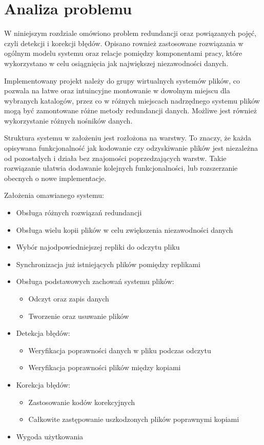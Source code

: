 \chapter{Analiza problemu}
\thispagestyle{chapterBeginStyle}
\label{rozdzial1}
W niniejszym rozdziale omówiono problem redundancji oraz powiązanych pojęć, czyli detekcji i korekcji błędów. Opisano rownież zastosowane rozwiązania w ogólnym modelu systemu oraz relacje pomiędzy komponentami pracy, które wykorzystano w celu osiągnięcia jak największej niezawodności danych.

Implementowany projekt należy do grupy wirtualnych systemów plików, co pozwala na łatwe oraz intuincyjne montowanie w dowolnym miejscu dla wybranych katalogów, przez co w różnych miejscach nadrzędnego systemu plików mogą być zamontowane różne metody redundancji danych. Możliwe jest również wykorzystanie różnych nośników danych. 

Struktura systemu w założeniu jest rozłożona na warstwy. To znaczy, że każda opisywana funkcjonalność jak kodowanie czy odzyskiwanie plików jest niezależna od pozostałych i działa bez znajomości poprzedzających warstw. Takie rozwiązanie ułatwia dodawanie kolejnych funkcjonalności, lub rozszerzanie obecnych o nowe implementacje.

Założenia omawianego systemu:
\begin{itemize}
    \item Obsługa różnych rozwiązań redundancji
    \item Obsługa wielu kopii plików w celu zwiększenia niezawodności danych
    \item Wybór najodpowiedniejszej repliki do odczytu pliku 
    \item Synchronizacja już istniejących plików pomiędzy replikami 
	\item Obsługa podstawowych zachowań systemu plików:
		\begin{itemize}
			\item Odczyt oraz zapis danych
			\item Tworzenie oraz usuwanie plików
		\end{itemize}
	\item Detekcja błędów:
		\begin{itemize}
			\item Weryfikacja poprawności danych w pliku podczas odczytu
			\item Weryfikacja poprawności plików między kopiami 
		\end{itemize}
	\item Korekcja błędów:
		\begin{itemize}
			\item Zastosowanie kodów korekcyjnych
			\item Całkowite zastępowanie uszkodzonych plików poprawnymi kopiami
		\end{itemize}
    \item Wygoda użytkowania
\end{itemize}
\newpage
